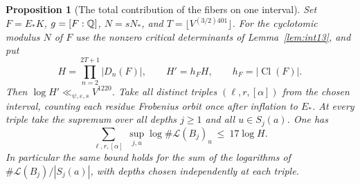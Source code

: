 \documentclass[a4paper,11pt]{article}
\newtheorem{proposition}{Proposition}[section]
\theoremstyle{definition}
\theoremstyle{remark}
\numberwithin{equation}{section}
\begin{document}
\begin{proposition}[The total contribution of the fibers on one interval]
\label{prop:odddivisor384}
Set \(F=E_*K\), \(g=[F:\mathbb Q]\), \(N=sN_*\), and
\(T=\lfloor V^{(3/2)401}\rfloor\). For the cyclotomic modulus
\(N\) of \(F\) use the nonzero critical determinants of
Lemma~\ref{lem:int13}, and put
\[
 H=\prod_{n=2}^{2T+1}|D_n(F)|,\qquad H'=h_F H,
 \qquad h_F=|\operatorname{Cl}(F)|.
\]
Then \(\log H'\ll_{\psi,\varepsilon,s}V^{1220}\).
Take all distinct triples \((\ell,r,[\alpha])\) from the
chosen interval, counting each residue Frobenius orbit once
after inflation to \(E_*\). At every triple take the supremum
over all depths \(j\ge1\) and all \(u\in S_j(a)\). One has
\[
 \sum_{\ell,r,[\alpha]}\ \sup_{j,u}
        \log\#\mathcal L(B_j)_u\ \le\ 17\log H .
\]
In particular the same bound holds for the sum of the logarithms
of \(\#\mathcal L(B_j)/|S_j(a)|\), with depths chosen independently
at each triple.
\end{proposition}
\end{document}
